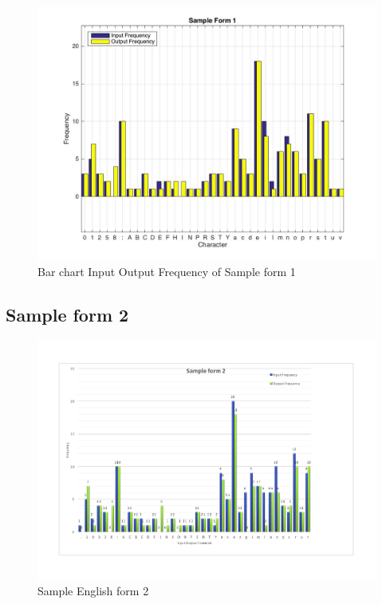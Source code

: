 \begin{figure}[H]
\centering
\includegraphics[width=1\textwidth]{Form1}
\caption {Bar chart Input Output Frequency of Sample form 1}
\label {fig:bar1}
\end{figure}

\subsection{Sample form 2}

\begin{figure}[H]
\centering
\includegraphics[width=1\textwidth]{form2}
\caption {Sample English form 2}
\label {fig:form2}
\end{figure}

